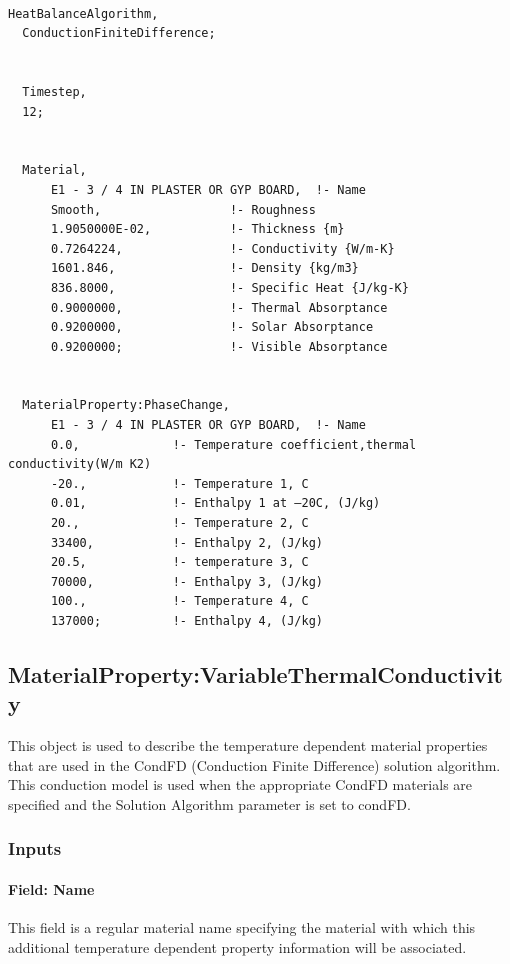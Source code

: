 \begin{lstlisting}

HeatBalanceAlgorithm,
  ConductionFiniteDifference;


  Timestep,
  12;


  Material,
      E1 - 3 / 4 IN PLASTER OR GYP BOARD,  !- Name
      Smooth,                  !- Roughness
      1.9050000E-02,           !- Thickness {m}
      0.7264224,               !- Conductivity {W/m-K}
      1601.846,                !- Density {kg/m3}
      836.8000,                !- Specific Heat {J/kg-K}
      0.9000000,               !- Thermal Absorptance
      0.9200000,               !- Solar Absorptance
      0.9200000;               !- Visible Absorptance


  MaterialProperty:PhaseChange,
      E1 - 3 / 4 IN PLASTER OR GYP BOARD,  !- Name
      0.0,             !- Temperature coefficient,thermal conductivity(W/m K2)
      -20.,            !- Temperature 1, C
      0.01,            !- Enthalpy 1 at –20C, (J/kg)
      20.,             !- Temperature 2, C
      33400,           !- Enthalpy 2, (J/kg)
      20.5,            !- temperature 3, C
      70000,           !- Enthalpy 3, (J/kg)
      100.,            !- Temperature 4, C
      137000;          !- Enthalpy 4, (J/kg)
\end{lstlisting}

\subsection{MaterialProperty:VariableThermalConductivity}\label{materialpropertyvariablethermalconductivity}

This object is used to describe the temperature dependent material properties that are used in the CondFD (Conduction Finite Difference) solution algorithm. This conduction model is used when the appropriate CondFD materials are specified and the Solution Algorithm parameter is set to condFD.

\subsubsection{Inputs}\label{inputs-6-027}

\paragraph{Field: Name}\label{field-name-6-022}

This field is a regular material name specifying the material with which this additional temperature dependent property information will be associated.


